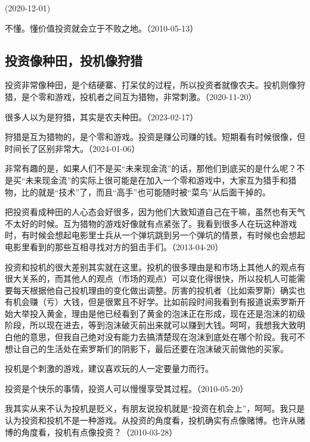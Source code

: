 (2020-12-01)


不懂。懂价值投资就会立于不败之地。（2010-05-13）

\subsection{投资像种田，投机像狩猎}

投资非常像种田，是个结硬寨、打呆仗的过程，所以投资者就像农夫。投机则像狩猎，是个零和游戏，投机者之间互为猎物，非常刺激。（2020-11-20）


很多人以为是狩猎，其实是农夫种田。（2023-02-17）

狩猎是互为猎物的，是个零和游戏。投资是赚公司赚的钱。短期看有时候很像，但时间长了区别非常大。（2024-01-06）

非常有趣的是，如果人们不是买“未来现金流”的话，那他们到底买的是什么呢？不是买“未来现金流”的实际上很可能是在加入一个零和游戏中，大家互为猎手和猎物，比的就是“技术”了，而且“高手”也可能随时被“菜鸟”从后面干掉的。

把投资看成种田的人心态会好很多，因为他们大致知道自己在干嘛，虽然也有天气不太好的时候。互为猎物的游戏好像就有点紧张了。我看到很多人在玩这种游戏时，有时候会想起电影里士兵从一个弹坑跳到另一个弹坑的情景，有时候也会想起电影里看到的那些互相寻找对方的狙击手们。（2013-04-20）

投资和投机的很大差别其实就在这里。投机的很多理由是和市场上其他人的观点有很大关系的，而其他人的观点（市场的观点）可以变化得很快，所以投机人可能需要每天根据他自己投机理由的变化做出调整。厉害的投机者（比如索罗斯）确实也有机会赚（亏）大钱，但是很累且不好学。比如前段时间我看到有报道说索罗斯开始大举投入黄金，理由是他已经看到了黄金的泡沫正在形成，现在还是泡沫的初级阶段，所以现在进去，等到泡沫破灭前出来就可以赚到大钱。呵呵，我想我大致明白他的意思，但我自己绝对没有能力去搞清楚现在泡沫到底处在哪个阶段。我可不想让自己的生活处在索罗斯们的阴影下，最后还要在泡沫破灭前做他的买家。

投机是个刺激的游戏，建议喜欢玩的人一定要量力而行。

投资是个快乐的事情，投资人可以慢慢享受其过程。（2010-05-20）

我其实从来不认为投机是贬义，有朋友说投机就是“投资在机会上”，呵呵。我只是认为投资和投机不是一种游戏。从投资的角度看，投机确实有点像赌博。也许从赌博的角度看，投机有点像投资？（2010-03-28）

